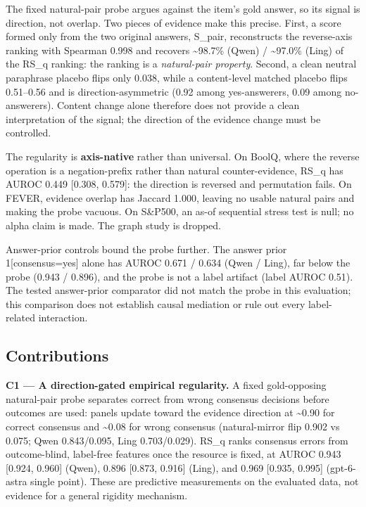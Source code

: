 \documentclass[11pt]{article}
\begin{document}
The fixed natural-pair probe argues against the item's gold answer, so its signal is direction, not overlap. Two pieces of evidence make this precise. First, a score formed only from the two original answers, S\_\allowbreak{}pair, reconstructs the reverse-axis ranking with Spearman 0.998 and recovers \textasciitilde{}98.7\% (Qwen) / \textasciitilde{}97.0\% (Ling) of the RS\_\allowbreak{}q ranking: the ranking is a \emph{natural-pair property}. Second, a clean neutral paraphrase placebo flips only 0.038, while a content-level matched placebo flips 0.51--0.56 and is direction-asymmetric (0.92 among yes-answerers, 0.09 among no-answerers). Content change alone therefore does not provide a clean interpretation of the signal; the direction of the evidence change must be controlled.

The regularity is \textbf{axis-native} rather than universal. On BoolQ, where the reverse operation is a negation-prefix rather than natural counter-evidence, RS\_\allowbreak{}q has AUROC 0.449 [0.308, 0.579]: the direction is reversed and permutation fails. On FEVER, evidence overlap has Jaccard 1.000, leaving no usable natural pairs and making the probe vacuous. On S\&P500, an as-of sequential stress test is null; no alpha claim is made. The graph study is dropped.

Answer-prior controls bound the probe further. The answer prior 1[consensus=yes] alone has AUROC 0.671 / 0.634 (Qwen / Ling), far below the probe (0.943 / 0.896), and the probe is not a label artifact (label AUROC 0.51). The tested answer-prior comparator did not match the probe in this evaluation; this comparison does not establish causal mediation or rule out every label-related interaction.

\subsection{Contributions}

\textbf{C1 --- A direction-gated empirical regularity.} A fixed gold-opposing natural-pair probe separates correct from wrong consensus decisions before outcomes are used: panels update toward the evidence direction at \textasciitilde{}0.90 for correct consensus and \textasciitilde{}0.08 for wrong consensus (natural-mirror flip 0.902 vs 0.075; Qwen 0.843/0.095, Ling 0.703/0.029). RS\_\allowbreak{}q ranks consensus errors from outcome-blind, label-free features once the resource is fixed, at AUROC 0.943 [0.924, 0.960] (Qwen), 0.896 [0.873, 0.916] (Ling), and 0.969 [0.935, 0.995] (gpt-6-astra single point). These are predictive measurements on the evaluated data, not evidence for a general rigidity mechanism.
\end{document}
